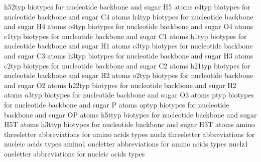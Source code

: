\documentclass[letterpaper,11pt,english]{sphinxmanual}
\begin{document}
\begin{sphinxVerbatim}[commandchars=\\\{\}]
h52typ          biotypes for nucleotide backbone and sugar H5\PYGZsq{}\PYGZsq{} atoms
c4typ           biotypes for nucleotide backbone and sugar C4\PYGZsq{} atoms
h4typ           biotypes for nucleotide backbone and sugar H4\PYGZsq{} atoms
o4typ           biotypes for nucleotide backbone and sugar O4\PYGZsq{} atoms
c1typ           biotypes for nucleotide backbone and sugar C1\PYGZsq{} atoms
h1typ           biotypes for nucleotide backbone and sugar H1\PYGZsq{} atoms
c3typ           biotypes for nucleotide backbone and sugar C3\PYGZsq{} atoms
h3typ           biotypes for nucleotide backbone and sugar H3\PYGZsq{} atoms
c2typ           biotypes for nucleotide backbone and sugar C2\PYGZsq{} atoms
h21typ          biotypes for nucleotide backbone and sugar H2\PYGZsq{} atoms
o2typ           biotypes for nucleotide backbone and sugar O2\PYGZsq{} atoms
h22typ          biotypes for nucleotide backbone and sugar H2\PYGZsq{}\PYGZsq{} atoms
o3typ           biotypes for nucleotide backbone and sugar O3\PYGZsq{} atoms
ptyp            biotypes for nucleotide backbone and sugar P atoms
optyp           biotypes for nucleotide backbone and sugar OP atoms
h5ttyp          biotypes for nucleotide backbone and sugar H5T atoms
h3ttyp          biotypes for nucleotide backbone and sugar H3T atoms
amino           three\PYGZhy{}letter abbreviations for amino acids types
nuclz           three\PYGZhy{}letter abbreviations for nucleic acids types
amino1          one\PYGZhy{}letter abbreviations for amino acids types
nuclz1          one\PYGZhy{}letter abbreviations for nucleic acids types
\end{sphinxVerbatim}

\end{document}
